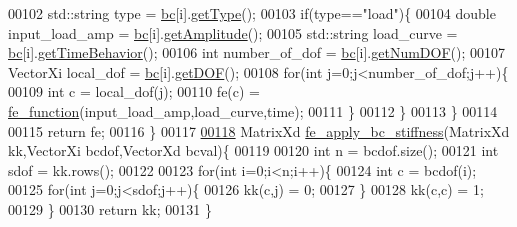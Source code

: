 \begin{DoxyCode}
00102         std::string type = \hyperlink{_global_variables_8h_a20bdb84bef6e8184528b6f4394cf4f7a}{bc}[i].\hyperlink{class_b_c_aa6afb3d4586f395578bef89c77e60449}{getType}();
00103         \textcolor{keywordflow}{if}(type==\textcolor{stringliteral}{"load"})\{
00104             \textcolor{keywordtype}{double} input\_load\_amp = \hyperlink{_global_variables_8h_a20bdb84bef6e8184528b6f4394cf4f7a}{bc}[i].\hyperlink{class_b_c_ad648545e6ee046075350cd9b3c88e610}{getAmplitude}();
00105             std::string load\_curve = \hyperlink{_global_variables_8h_a20bdb84bef6e8184528b6f4394cf4f7a}{bc}[i].\hyperlink{class_b_c_a3590d0a29a9261d99f21ee75340e5722}{getTimeBehavior}();
00106             \textcolor{keywordtype}{int} number\_of\_dof = \hyperlink{_global_variables_8h_a20bdb84bef6e8184528b6f4394cf4f7a}{bc}[i].\hyperlink{class_b_c_a6e42c3db5c67435bf2616768959866e9}{getNumDOF}();
00107             VectorXi local\_dof = \hyperlink{_global_variables_8h_a20bdb84bef6e8184528b6f4394cf4f7a}{bc}[i].\hyperlink{class_b_c_a0bc8eb90956a082ada5e4daa5e32c9fc}{getDOF}();
00108             \textcolor{keywordflow}{for}(\textcolor{keywordtype}{int} j=0;j<number\_of\_dof;j++)\{
00109                 \textcolor{keywordtype}{int} c = local\_dof(j);
00110                 fe(c) = \hyperlink{functions_8h_a5ce8a3cf9dcc8b599ac40f7f3a48f196}{fe\_function}(input\_load\_amp,load\_curve,time);
00111             \}
00112         \}
00113     \}
00114 
00115     \textcolor{keywordflow}{return} fe;
00116 \}
00117 
\hyperlink{fe__apply__bc_8cpp_a3c73fda948017ac96aeb19889cfc1cba}{00118} MatrixXd \hyperlink{fe__apply__bc_8cpp_a3c73fda948017ac96aeb19889cfc1cba}{fe\_apply\_bc\_stiffness}(MatrixXd kk,VectorXi bcdof,VectorXd bcval)\{
00119 
00120     \textcolor{keywordtype}{int} n = bcdof.size();
00121     \textcolor{keywordtype}{int} sdof = kk.rows();
00122 
00123     \textcolor{keywordflow}{for}(\textcolor{keywordtype}{int} i=0;i<n;i++)\{
00124         \textcolor{keywordtype}{int} c = bcdof(i);
00125         \textcolor{keywordflow}{for}(\textcolor{keywordtype}{int} j=0;j<sdof;j++)\{
00126             kk(c,j) = 0;
00127         \}
00128         kk(c,c) = 1;
00129     \}
00130     \textcolor{keywordflow}{return} kk;
00131 \}
\end{DoxyCode}
